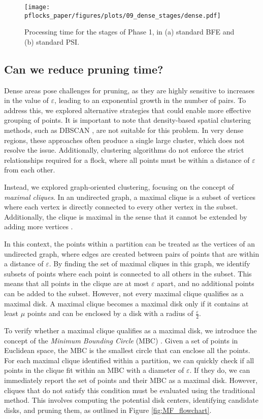 \begin{figure}
    \centering
    \texttt{[image: pflocks\_paper/figures/plots/09\_dense\_stages/dense.pdf]} 
    \caption{Processing time for the stages of Phase 1, in (a) standard BFE and (b) standard  PSI.}\label{fig:dense_stages}
\end{figure}

\subsection{Can we reduce pruning time?}
Dense areas pose challenges for pruning, as they are highly sensitive to increases in the value of $\varepsilon$, leading to an exponential growth in the number of pairs. To address this, we explored alternative strategies that could enable more effective grouping of points. It is important to note that density-based spatial clustering methods, such as DBSCAN \cite{dbscan}, are not suitable for this problem. In very dense regions, these approaches often produce a single large cluster, which does not resolve the issue. Additionally, clustering algorithms do not enforce the strict relationships required for a flock, where all points must be within a distance of $\varepsilon$ from each other.

Instead, we explored graph-oriented clustering, focusing on the concept of \textit{maximal cliques}. In an undirected graph, a maximal clique is a subset of vertices where each vertex is directly connected to every other vertex in the subset. Additionally, the clique is maximal in the sense that it cannot be extended by adding more vertices \cite{tomita_clique_2013, bron_algorithm_1973}.

In this context, the points within a partition can be treated as the vertices of an undirected graph, where edges are created between pairs of points that are within a distance of $\varepsilon$. By finding the set of maximal cliques in this graph, we identify subsets of points where each point is connected to all others in the subset. This means that all points in the clique are at most $\varepsilon$ apart, and no additional points can be added to the subset.
However, not every maximal clique qualifies as a maximal disk. A maximal clique becomes a maximal disk only if it contains at least $\mu$ points and can be enclosed by a disk with a radius of $\frac{\varepsilon}{2}$.

To verify whether a maximal clique qualifies as a maximal disk, we introduce the concept of the \textit{Minimum Bounding Circle} (MBC) \cite{welzl_mbc_1991}. Given a set of points in Euclidean space, the MBC is the smallest circle that can enclose all the points. For each maximal clique identified within a partition, we can quickly check if all points in the clique fit within an MBC with a diameter of $\varepsilon$. If they do, we can immediately report the set of points and their MBC as a maximal disk.  However, cliques that do not satisfy this condition must be evaluated using the traditional method. This involves computing the potential disk centers, identifying candidate disks, and pruning them, as outlined in Figure \ref{fig:MF_flowchart}.

